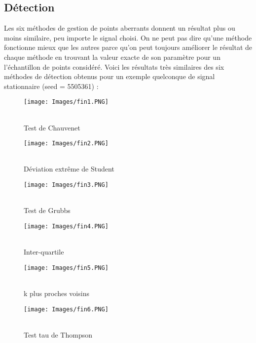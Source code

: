 \documentclass[a4paper,12pt]{article} %
\begin{document}
        \subsection{Détection}
            Les six méthodes de gestion de points aberrants donnent un résultat plus ou moins similaire, peu importe le signal choisi. On ne peut pas dire qu'une méthode fonctionne mieux que les autres parce qu'on peut toujours améliorer le résultat de chaque méthode en trouvant la valeur exacte de son paramètre pour un l'échantillon de points considéré. Voici les résultats très similaires des six méthodes de détection obtenus pour un exemple quelconque de signal stationnaire (seed = 5505361) :
            \begin{figure}[H] %
            \texttt{[image: Images/fin1.PNG]} %
            \caption{\\Test de Chauvenet} %
            \label{m15} %
            \endminipage
            \hfill
            \endminipage
            \texttt{[image: Images/fin2.PNG]}  
            \caption{\\Déviation extrême de Student}
            \label{m5}
            \endminipage
            \hfill
            \endminipage
            \texttt{[image: Images/fin3.PNG]}  
            \caption{\\Test de Grubbs}
            \label{m35}
            \endminipage
            \end{figure}
            
            \begin{figure}[H] %
            \texttt{[image: Images/fin4.PNG]} %
            \caption{\\Inter-quartile} %
            \label{m15} %
            \endminipage
            \hfill
            \endminipage
            \texttt{[image: Images/fin5.PNG]}  
            \caption{\\k plus proches voisins}
            \label{m5}
            \endminipage
            \hfill
            \endminipage
            \texttt{[image: Images/fin6.PNG]}  
            \caption{\\Test tau de Thompson}
            \label{m35}
            \endminipage
            \end{figure}
            
\end{document}

